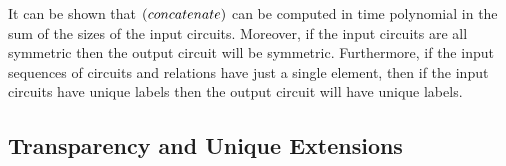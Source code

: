 \documentclass[../paper.tex]{subfiles}
\begin{document}

It can be shown that ${\normalfont\textsc{(}}concatenate)$ can be computed in time polynomial in
the sum of the sizes of the input circuits. Moreover, if the input circuits are
all symmetric then the output circuit will be symmetric. Furthermore, if the
input sequences of circuits and relations have just a single element, then if
the input circuits have unique labels then the output circuit will have unique
labels.

\subsection{Transparency and Unique Extensions}
\label{sec:transparency-and-unique-extensions}
\end{document}
